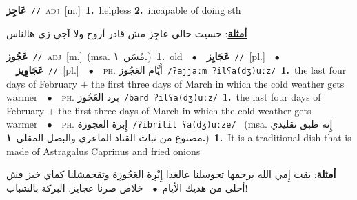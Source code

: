 \documentclass[10pt,a4paper,twoside]{article} %
\begin{document}
\begin{multicols}{2}
{\setlength\topsep{0pt}\textbf{\foreignlanguage{arabic}{عَاجِز}}\ {\color{gray}\texttt{//}\color{black}}\ \textsc{adj}\ [m.]\ \textbf{1.}~helpless  \textbf{2.}~incapable of doing sth\  \begin{flushright}\color{gray}\foreignlanguage{arabic}{\textbf{\underline{\foreignlanguage{arabic}{أمثلة}}}: حسيت حالي عاجِز مش قادر أروح ولا آجي زي هالناس}\end{flushright}\color{black}} \vspace{2mm}

{\setlength\topsep{0pt}\textbf{\foreignlanguage{arabic}{عَجُوز}}\ {\color{gray}\texttt{//}\color{black}}\ \textsc{adj}\ [m.]\ \color{gray}(msa. \foreignlanguage{arabic}{مُسَن}~\foreignlanguage{arabic}{\textbf{١.}})\color{black}\ \textbf{1.}~old\ \ $\bullet$\ \ \setlength\topsep{0pt}\textbf{\foreignlanguage{arabic}{عَجَايِز}}\ {\color{gray}\texttt{//}\color{black}}\ [pl.]\ \ $\bullet$\ \ \setlength\topsep{0pt}\textbf{\foreignlanguage{arabic}{عَجَاوِيز}}\ {\color{gray}\texttt{//}\color{black}}\ [pl.]\ \ $\bullet$\ \ \textsc{ph.} \color{gray} \foreignlanguage{arabic}{أَيَّام العَجُوز}\color{black}\ {\color{gray}\texttt{/{\sffamily ʔajjaːm ʔilʕa(dʒ)uːz}/}\color{black}}\ \textbf{1.}~the last four days of February + the first three days of March in which the cold weather gets warmer\ \ $\bullet$\ \ \textsc{ph.} \color{gray} \foreignlanguage{arabic}{برد العَجُوز}\color{black}\ {\color{gray}\texttt{/{\sffamily bard ʔilʕa(dʒ)uːz}/}\color{black}}\ \textbf{1.}~the last four days of February + the first three days of March in which the cold weather gets warmer\ \ $\bullet$\ \ \textsc{ph.} \color{gray} \foreignlanguage{arabic}{إِبرة العجوزة}\color{black}\ {\color{gray}\texttt{/{\sffamily ʔibritil ʕa(dʒ)uːze}/}\color{black}}\ \color{gray} (msa. \foreignlanguage{arabic}{إِنه طبق تقليدي مصنوع من نبات القتاد الماعزي والبصل المقلي}~\foreignlanguage{arabic}{\textbf{١.}})\color{black}\ \textbf{1.}~It is a traditional dish that is made of Astragalus Caprinus and fried onions\  \begin{flushright}\color{gray}\foreignlanguage{arabic}{\textbf{\underline{\foreignlanguage{arabic}{أمثلة}}}: بقت إِمي الله يرحمها تحوسلنا عالغدا إِبْرِة العَجُوزِة وتقحمشلنا كماي خبز فش أحلى من هذيك الأيام\ $\bullet$\ \  خلاص صرنا عجايز. البركة بالشباب!}\end{flushright}\color{black}} \vspace{2mm}


\end{multicols}
\end{document}
